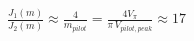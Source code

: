 \documentclass[border=1pt]{standalone}
\begin{document}
\fontsize{14}{16.8}\selectfont
\(\displaystyle \frac{J_1(m)}{J_2(m)} \approx \frac{4}{m_{pilot}} = \frac{4 V_\pi}{\pi\,V_{pilot,peak}} \approx 17\)
\end{document}
